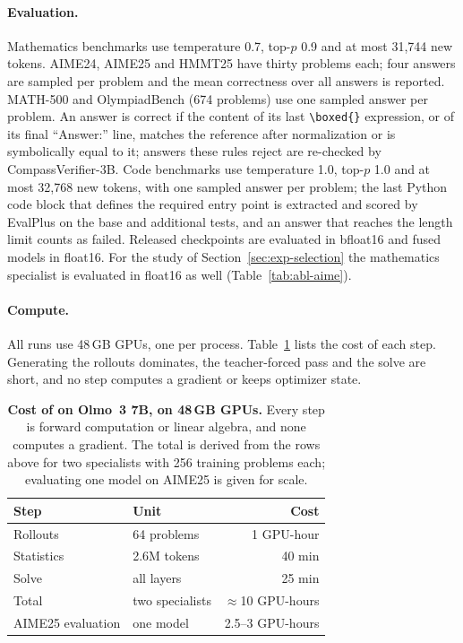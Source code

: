 \paragraph{Evaluation.} Mathematics benchmarks use temperature 0.7, top-$p$
0.9 and at most 31{,}744 new tokens. AIME24, AIME25 and HMMT25 have thirty
problems each; four answers are sampled per problem and the mean correctness
over all answers is reported. MATH-500 and OlympiadBench (674 problems) use
one sampled answer per problem.
An answer is correct if the content of its last
\texttt{\textbackslash boxed\{\}} expression, or of its final ``Answer:''
line, matches the reference after normalization or is symbolically equal to
it; answers these rules reject are re-checked by CompassVerifier-3B. Code
benchmarks use temperature 1.0, top-$p$ 1.0 and at most 32{,}768 new tokens,
with one sampled answer per problem; the last Python code block that defines
the required entry point is extracted and scored by EvalPlus on the base and
additional tests, and an answer that reaches the length limit counts as
failed. Released checkpoints are evaluated in bfloat16 and fused models in
float16. For the study of Section~\ref{sec:exp-selection} the mathematics
specialist is evaluated in float16 as well (Table~\ref{tab:abl-aime}).

\paragraph{Compute.} All runs use 48\,GB GPUs, one per process.
Table~\ref{tab:cost} lists the cost of each step. Generating the rollouts
dominates, the teacher-forced pass and the solve are short, and no step
computes a gradient or keeps optimizer state.

\begin{table}[t]
\centering\small
\setlength{\tabcolsep}{8pt}
\begin{tabular}{@{}llr@{}}
\toprule
Step & Unit & Cost \\
\midrule
Rollouts & 64 problems & 1 GPU-hour \\
Statistics & 2.6M tokens & 40 min \\
Solve & all layers & 25 min \\
\midrule
Total & two specialists & $\approx$10 GPU-hours \\
\midrule
AIME25 evaluation & one model & 2.5--3 GPU-hours \\
\bottomrule
\end{tabular}
\caption{\textbf{Cost of \method on Olmo~3 7B, on 48\,GB GPUs.} Every step is
forward computation or linear algebra, and none computes a gradient. The total
is derived from the rows above for two specialists with 256 training problems
each; evaluating one model on AIME25 is given for scale.}
\label{tab:cost}
\end{table}

